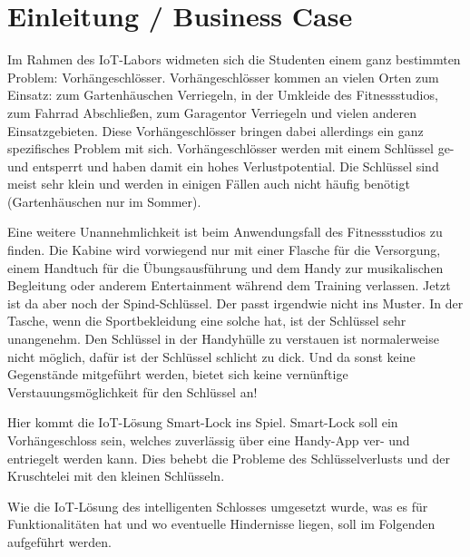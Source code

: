 
\chapter{Einleitung / Business Case}
Im Rahmen des \ac{IoT}-Labors widmeten sich die Studenten einem ganz bestimmten Problem: Vorhängeschlösser. Vorhängeschlösser kommen an vielen Orten zum Einsatz: zum Gartenhäuschen Verriegeln, in der Umkleide des Fitnessstudios, zum Fahrrad Abschließen, zum Garagentor Verriegeln und vielen anderen Einsatzgebieten. Diese Vorhängeschlösser bringen dabei allerdings ein ganz spezifisches Problem mit sich. Vorhängeschlösser werden mit einem Schlüssel ge- und entsperrt und haben damit ein hohes Verlustpotential. Die Schlüssel sind meist sehr klein und werden in einigen Fällen auch nicht häufig benötigt (Gartenhäuschen nur im Sommer).

Eine weitere Unannehmlichkeit ist beim Anwendungsfall des Fitnessstudios zu finden. Die Kabine wird vorwiegend nur mit einer Flasche für die Versorgung, einem Handtuch für die Übungsausführung und dem Handy zur musikalischen Begleitung oder anderem Entertainment während dem Training verlassen. Jetzt ist da aber noch der Spind-Schlüssel. Der passt irgendwie nicht ins Muster. In der Tasche, wenn die Sportbekleidung eine solche hat, ist der Schlüssel sehr unangenehm. Den Schlüssel in der Handyhülle zu verstauen ist normalerweise nicht möglich, dafür ist der Schlüssel schlicht zu dick. Und da sonst keine Gegenstände mitgeführt werden, bietet sich keine vernünftige Verstauungsmöglichkeit für den Schlüssel an! 

Hier kommt die \ac{IoT}-Lösung Smart-Lock ins Spiel. Smart-Lock soll ein Vorhängeschloss sein, welches zuverlässig über eine Handy-App ver- und entriegelt werden kann. Dies behebt die Probleme des Schlüsselverlusts und der \glqq Kruschtelei\grqq{} mit den kleinen Schlüsseln.

Wie die \ac{IoT}-Lösung des intelligenten Schlosses umgesetzt wurde, was es für Funktionalitäten hat und wo eventuelle Hindernisse liegen, soll im Folgenden aufgeführt werden.